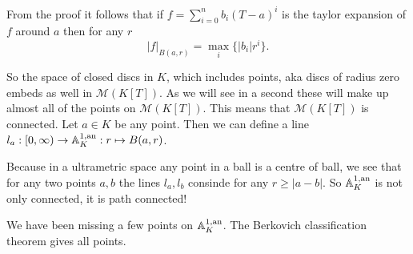 \begin{remark}\label{rem:norm_disk}
	From the proof it follows that if $f = \sum_{i = 0}^{n} b_i (T-a)^{i}$ is the taylor expansion of $f$ around $a$ then for any $r$
	\[
		|f|_{B(a, r)} = \max_{i}\{  |b_i|r^{i}\}
	.\] 
\end{remark}


So the space of closed discs in $K$, which includes points, aka discs of radius zero embeds as well in $\mathcal{M} (K[T])$. 
As we will see in a second these will make up almost all of the points on $\mathcal{M} (K[T])$. 
This means that $\mathcal{M}(K[T])$ is connected. 
Let $a \in K$ be any point. Then we can define a line $l_a: [0, \infty) \to  \mathbb{A}_K^{1, \text{an}}: r\mapsto B(a, r)$. 


Because in a ultrametric space any point in a ball is a centre of ball, we see that for any two points $a, b$ the lines $l_a, l_b$ consinde for any $r \ge |a - b|$. 
So $\mathbb{A}_K^{1,\text{an}}$ is not only connected, it is path connected!

We have been missing a few points on $\mathbb{A}_K^{1, \text{an}}$. 
The Berkovich classification theorem gives all points. 







